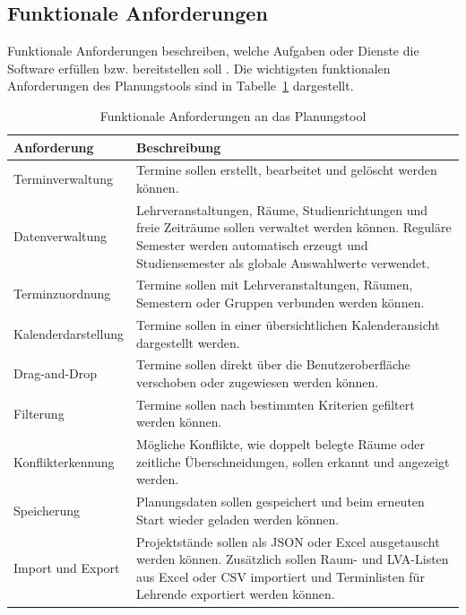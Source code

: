 \documentclass[12pt,a4paper]{article}
\begin{document}
\subsection{Funktionale Anforderungen}

Funktionale Anforderungen beschreiben, welche Aufgaben oder Dienste die Software erfüllen bzw. bereitstellen soll \cite{sommerville2016software}. Die wichtigsten funktionalen Anforderungen des Planungstools sind in Tabelle~\ref{tab:funktionale-anforderungen} dargestellt.

\begin{table}[H]
\centering
\caption{Funktionale Anforderungen an das Planungstool}
\label{tab:funktionale-anforderungen}
\begin{tabular}{|p{4.5cm}|p{8.5cm}|}
\hline
\textbf{Anforderung} & \textbf{Beschreibung} \\
\hline
Terminverwaltung & Termine sollen erstellt, bearbeitet und gelöscht werden können. \\
\hline
Datenverwaltung & Lehrveranstaltungen, Räume, Studienrichtungen und freie Zeiträume sollen verwaltet werden können. Reguläre Semester werden automatisch erzeugt und Studiensemester als globale Auswahlwerte verwendet. \\
\hline
Terminzuordnung & Termine sollen mit Lehrveranstaltungen, Räumen, Semestern oder Gruppen verbunden werden können. \\
\hline
Kalenderdarstellung & Termine sollen in einer übersichtlichen Kalenderansicht dargestellt werden. \\
\hline
Drag-and-Drop & Termine sollen direkt über die Benutzeroberfläche verschoben oder zugewiesen werden können. \\
\hline
Filterung & Termine sollen nach bestimmten Kriterien gefiltert werden können. \\
\hline
Konflikterkennung & Mögliche Konflikte, wie doppelt belegte Räume oder zeitliche Überschneidungen, sollen erkannt und angezeigt werden. \\
\hline
Speicherung & Planungsdaten sollen gespeichert und beim erneuten Start wieder geladen werden können. \\
\hline
Import und Export & Projektstände sollen als JSON oder Excel ausgetauscht werden können. Zusätzlich sollen Raum- und LVA-Listen aus Excel oder CSV importiert und Terminlisten für Lehrende exportiert werden können. \\
\hline
\end{tabular}
\end{table}
\end{document}

